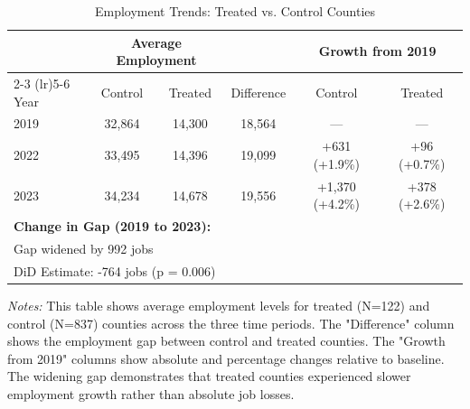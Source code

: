 \documentclass[12pt]{article}
\begin{document}
\begin{table}[H]
\centering
\caption{Employment Trends: Treated vs. Control Counties}
\label{tab:employment_trends}
\begin{tabular}{lccccc}
\toprule
& \multicolumn{2}{c}{Average Employment} & & \multicolumn{2}{c}{Growth from 2019} \\
\cmidrule(lr){2-3} \cmidrule(lr){5-6}
Year & Control & Treated & Difference & Control & Treated \\
\midrule
2019 & 32,864 & 14,300 & 18,564 & --- & --- \\
2022 & 33,495 & 14,396 & 19,099 & +631 (+1.9\%) & +96 (+0.7\%) \\
2023 & 34,234 & 14,678 & 19,556 & +1,370 (+4.2\%) & +378 (+2.6\%) \\
\midrule
\multicolumn{6}{l}{\textbf{Change in Gap (2019 to 2023):}} \\
\multicolumn{6}{l}{\hspace{0.2in} Gap widened by 992 jobs} \\
\multicolumn{6}{l}{\hspace{0.2in} DiD Estimate: -764 jobs (p = 0.006)} \\
\bottomrule
\end{tabular}
\begin{tablenotes}
\small
\item \textit{Notes:} This table shows average employment levels for treated (N=122) and control (N=837) counties across the three time periods. The "Difference" column shows the employment gap between control and treated counties. The "Growth from 2019" columns show absolute and percentage changes relative to baseline. The widening gap demonstrates that treated counties experienced slower employment growth rather than absolute job losses.
\end{tablenotes}
\end{table}
\end{document}
